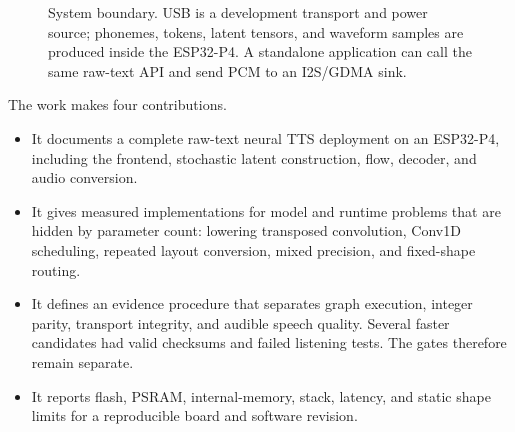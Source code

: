 \documentclass[10pt]{article}
\begin{document}
\begin{figure}[t]
\centering
{}
\caption{System boundary. USB is a development transport and power source;
phonemes, tokens, latent tensors, and waveform samples are produced inside
the ESP32-P4. A standalone application can call the same raw-text API and
send PCM to an I2S/GDMA sink.}
\label{fig:system-boundary}
\end{figure}

The work makes four contributions.

\begin{itemize}
  \item It documents a complete raw-text neural TTS deployment on an
  ESP32-P4, including the frontend, stochastic latent construction, flow,
  decoder, and audio conversion.
  \item It gives measured implementations for model and runtime problems that
  are hidden by parameter count: lowering transposed convolution, Conv1D
  scheduling, repeated layout conversion, mixed precision, and fixed-shape
  routing.
  \item It defines an evidence procedure that separates graph execution,
  integer parity, transport integrity, and audible speech quality. Several
  faster candidates had valid checksums and failed listening tests. The gates
  therefore remain separate.
  \item It reports flash, PSRAM, internal-memory, stack, latency, and static
  shape limits for a reproducible board and software revision.
\end{itemize}
\end{document}
